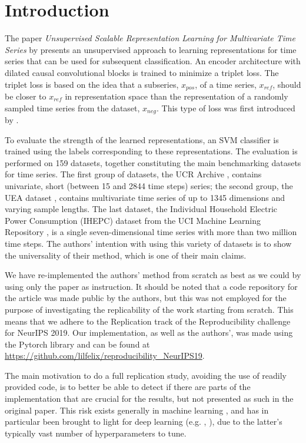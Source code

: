 \section{Introduction}

The paper \textit{Unsupervised Scalable Representation Learning for Multivariate Time Series} by \cite{FranceschiUnsupervised2019} presents an unsupervised approach to learning representations for time series that can be used for subsequent classification. An encoder architecture with dilated causal convolutional blocks is trained to minimize a triplet loss. The triplet loss is based on the idea that a subseries, $x_{pos}$, of a time series, $x_{ref}$, should be closer to $x_{ref}$ in representation space than the representation of a randomly sampled time series from the dataset, $x_{neg}$. This type of loss was first introduced by \cite{ogtriplet}.

To evaluate the strength of the learned representations, an SVM classifier is trained using the labels corresponding to these representations. The evaluation is performed on 159 datasets, together constituting the main benchmarking datasets for time series. The first group of datasets, the UCR Archive \cite{UCRArchive2018}, contains univariate, short (between 15 and 2844 time steps) series; the second group, the UEA dataset \cite{bagnall2018uea}, contains multivariate time series of up to 1345 dimensions and varying sample lengths. The last dataset, the Individual Household Electric Power Consumption (IHEPC) dataset from the UCI Machine Learning Repository \cite{Dua:2019}, is a single seven-dimensional time series with more than two million time steps. The authors' intention with using this variety of datasets is to show the universality of their method, which is one of their main claims.

We have re-implemented the authors' method from scratch as best as we could by using only the paper as instruction. It should be noted that a code repository for the article was made public by the authors, but this was not employed for the purpose of investigating the replicability of the work starting from scratch. This means that we adhere to the Replication track of the Reproducibility challenge for NeurIPS 2019. Our implementation, as well as the authors', was made using the Pytorch \cite{Pytorchpaszke2017automatic} library and can be found at \url{https://github.com/lilfelix/reproducibility_NeurIPS19}.

The main motivation to do a full replication study, avoiding the use of readily provided code, is to better be able to detect if there are parts of the implementation that are crucial for the results, but not presented as such in the original paper. This risk exists generally in machine learning \cite{LiptonTroubling}, and has in particular been brought to light for deep learning (e.g. \cite{henderson2017reinforcement}, \cite{Hyper1Melis}), due to the latter's typically vast number of hyperparameters to tune.

